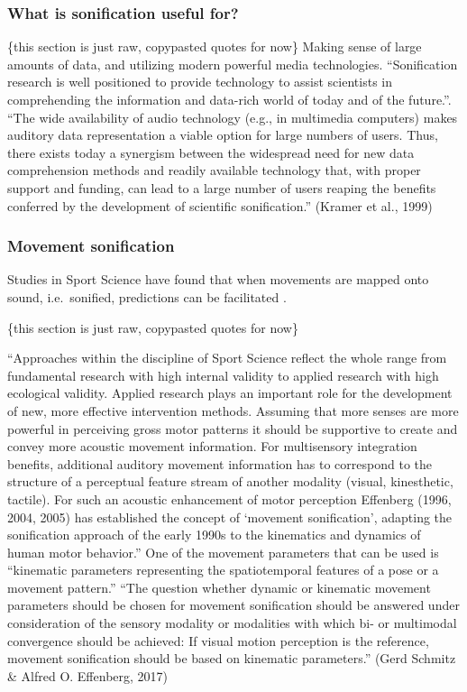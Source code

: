 \documentclass[10pt,a4paper,onecolumn]{article}
\begin{document}
\hypertarget{what-is-sonification-useful-for}{%
\subsubsection{What is sonification useful for?}\label{what-is-sonification-useful-for}}

\{this section is just raw, copypasted quotes for now\}
Making sense of large amounts of data, and utilizing modern powerful media technologies. ``Sonification research is well positioned to provide technology to assist scientists in comprehending the information and data-rich world of today and of the future.''. ``The wide availability of audio technology (e.g., in multimedia computers) makes auditory data representation a viable option for large numbers of users. Thus, there exists today a synergism between the widespread need for new data comprehension methods and readily available technology that, with proper support and funding, can lead to a large number of users reaping the benefits conferred by the development of scientific sonification.'' (Kramer et al., 1999)

\hypertarget{movement-sonification}{%
\subsubsection{Movement sonification}\label{movement-sonification}}

Studies in Sport Science have found that when movements are mapped onto sound, i.e.~sonified, predictions can be facilitated \autocite{effenbergMovementSonificationEffects2005}.

\{this section is just raw, copypasted quotes for now\}

``Approaches within the discipline of Sport Science reflect the whole range from fundamental research with high internal validity to applied research with high ecological validity. Applied research plays an important role for the development of new, more effective intervention methods. Assuming that more senses are more powerful in perceiving gross motor patterns it should be supportive to create and convey more acoustic movement information. For multisensory integration benefits, additional auditory movement information has to correspond to the structure of a perceptual feature stream of another modality (visual, kinesthetic, tactile). For such an acoustic enhancement of motor perception Effenberg (1996, 2004, 2005) has established the concept of `movement sonification', adapting the sonification approach of the early 1990s to the kinematics and dynamics of human motor behavior.'' One of the movement parameters that can be used is ``kinematic parameters representing the spatiotemporal features of a pose or a movement pattern.'' ``The question whether dynamic or kinematic movement parameters should be chosen for movement sonification should be answered under consideration of the sensory modality or modalities with which bi- or multimodal convergence should be achieved: If visual motion perception is the reference, movement sonification should be based on kinematic parameters.'' (Gerd Schmitz \& Alfred O. Effenberg, 2017)
\end{document}
